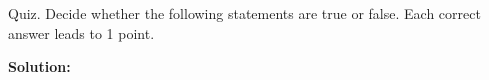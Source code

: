 \newpage
\begin{question}{0}{Quiz. Decide whether the following statements are true or false. Each correct answer leads to 1 point.}{}{}{}{}{}
	\begin{solution}
		\textbf{Solution:}
	\end{solution}
	
	\begin{quiz}{1}
    \end{quiz}
\end{question}




